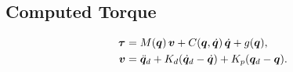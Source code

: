 ﻿\subsection{Computed Torque}
\begin{align}
  \bm{\tau} &= M(\bm{q})\,\bm{v} + C(\bm{q},\dot{\bm{q}})\,\dot{\bm{q}} + g(\bm{q}),\\
  \bm{v} &= \ddot{\bm{q}}_d + K_d(\dot{\bm{q}}_d-\dot{\bm{q}}) + K_p(\bm{q}_d-\bm{q}).
\end{align}
